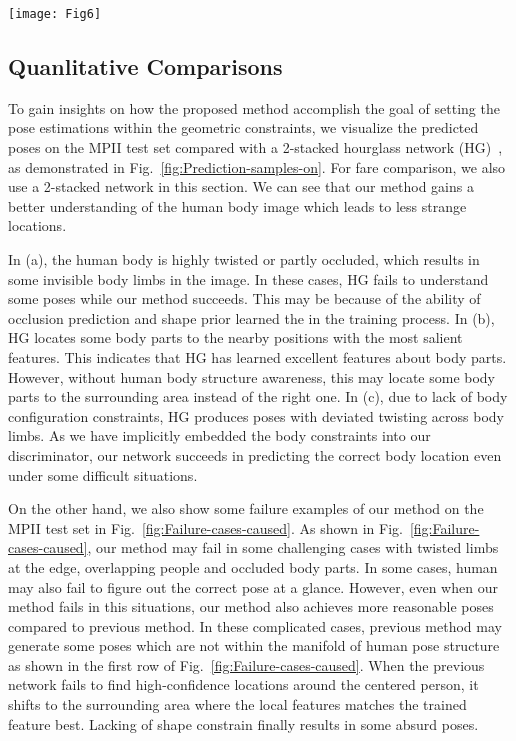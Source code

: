\documentclass[10pt,letterpaper,twocolumn]{article}
\begin{document}
\begin{figure*}[!t]
\centering
\texttt{[image: Fig6]}
\caption{Prediction samples on the MPII test set. The first row: original images. The second row: results by stacked hourglass network (HG)~\cite{conf/eccv/NewellYD16}. The third row: results by our method. (a)-(c) stand for three kinds of failure with HG.}
\label{fig:Prediction-samples-on}
\end{figure*}

\subsection{Quanlitative Comparisons}\label{subsec:Comparison-of-Predicted}

To gain insights on how the proposed method accomplish the goal of setting the pose estimations  within the geometric constraints,
we visualize the predicted poses on the MPII test set compared with a 2-stacked hourglass network (HG)~\cite{conf/eccv/NewellYD16}, as demonstrated in Fig.~\ref{fig:Prediction-samples-on}. For fare comparison, we also use a 2-stacked network in this section.
We can see that our method gains a better understanding of the human body image which leads to less strange locations.


In (a), the human body is highly twisted or partly occluded, which results in some invisible body limbs in the image. In these cases, HG fails to understand some poses while our method succeeds. This may be because of the ability of occlusion prediction and shape prior
learned  the in the training process. In (b), HG locates some body parts to the nearby positions with the most salient features. This indicates that HG has learned excellent features about body parts. However, without human body structure awareness, this may locate some body parts to the surrounding area instead of the right one. In (c), due to lack of body configuration constraints, HG produces poses with deviated  twisting across body limbs. As we have implicitly embedded the body constraints into our discriminator, our network succeeds in predicting the correct body location even under some difficult situations.

On the other hand, we also show some failure examples of our method on the MPII test set in Fig.~\ref{fig:Failure-cases-caused}. As shown in Fig.~\ref{fig:Failure-cases-caused}, our method may fail in  some challenging cases with twisted limbs at the edge, overlapping people and occluded body parts. In some cases, human may also fail to figure out the correct pose at a glance. However, even when our method fails in this situations, our method also achieves more reasonable poses compared to previous method. In these complicated cases, previous method may generate some poses which are not within the manifold of human pose structure as shown in the first row of Fig.~\ref{fig:Failure-cases-caused}. When the previous network fails to find high-confidence locations around the centered person, it  shifts to the surrounding area where the local features matches the trained feature best. Lacking of shape constrain finally results in some absurd poses.
\end{document}
